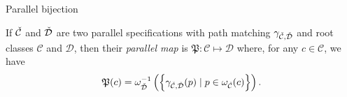 
\begin{frame}{Parallel bijection}
    \begin{definition}
    If $\check{\mathcal{C}}$ and $\check{\mathcal{D}}$ are two parallel specifications with path matching $\gamma_{\check{\mathcal{C}},\check{\mathcal{D}}}$ and root classes $\mathcal{C}$ and $\mathcal{D}$, then their \emph{parallel map} is
    $\mathfrak{P}: \mathcal{C} \mapsto \mathcal{D}$ where, for any $c \in \mathcal{C}$, we have
    \[
        \mathfrak{P}(c) = \omega_{\check{\mathcal{D}}}^{-1}\left(\left\{\gamma_{\check{\mathcal{C}},\check{\mathcal{D}}}(p) \mid p \in \omega_{\check{\mathcal{C}}}(c)\right\}\right).
    \]
    \end{definition}
\end{frame}